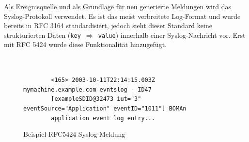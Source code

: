 Als Ereignisquelle und als Grundlage für neu generierte Meldungen wird das 
Syslog-Protokoll verwendet. Es ist das meist verbreitete Log-Format und wurde 
bereits in RFC 3164 standardisiert, jedoch sieht dieser Standard keine strukturierten 
Daten (\texttt{key $\Rightarrow$ value}) innerhalb einer Syslog-Nachricht vor. 
Erst mit RFC 5424 \cite{rfc5424} wurde diese Funktionalität hinzugefügt.

\begin{table}[ht]
    \caption{Aufbau RFC 5424}
    \label{table:rfc5424}\vspace{0.2cm}
\end{table}

\newpage

\begin{figure}[h]
    \caption{Beispiel RFC5424 Syslog-Meldung}
    \label{log_example}\vspace{0.2cm}
    \centering
    \begin{shaded*}
    \small{
        \begin{verbatim}
        
        
        <165> 2003-10-11T22:14:15.003Z mymachine.example.com evntslog - ID47 
        [exampleSDID@32473 iut="3" eventSource="Application" eventID="1011"] BOMAn 
        application event log entry...
        \end{verbatim}}
    \end{shaded*}
\end{figure}

